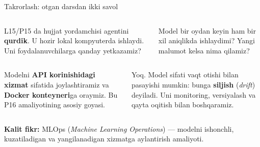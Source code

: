 \documentclass[aspectratio=169,11pt]{beamer}
\newcommand{\uzq}{\textquotesingle{}}   %
\begin{document}
\begin{frame}{Takrorlash: o\uzq{}tgan darsdan ikki savol}
  \small

  \begin{columns}[T,totalwidth=\textwidth]
    \begin{column}{0.49\textwidth}
      \begin{tcolorbox}[warnbox,title=1-savol]
        L15/P15 da hujjat yordamchisi agentini \textbf{qurdik}.
        U hozir lokal kompyuterda ishlaydi. Uni foydalanuvchilarga
        qanday yetkazamiz?
      \end{tcolorbox}
    \end{column}

    \begin{column}{0.49\textwidth}
      \begin{tcolorbox}[warnbox,title=2-savol]
        Model bir oydan keyin ham bir xil aniqlikda ishlaydimi?
        Yangi ma\uzq{}lumot kelsa nima qilamiz?
      \end{tcolorbox}
    \end{column}
  \end{columns}

  \pause
  \vspace{5pt}

  \begin{columns}[T,totalwidth=\textwidth]
    \begin{column}{0.49\textwidth}
      \begin{tcolorbox}[okbox,title=1-javob]
        Modelni \textbf{API ko\uzq{}rinishidagi xizmat} sifatida
        joylashtiramiz va \textbf{Docker konteyneri}ga o\uzq{}raymiz.
        Bu P16 amaliyotining asosiy g\uzq{}oyasi.
      \end{tcolorbox}
    \end{column}

    \begin{column}{0.49\textwidth}
      \begin{tcolorbox}[okbox,title=2-javob]
        Yo\uzq{}q. Model sifati vaqt o\uzq{}tishi bilan pasayishi mumkin:
        bunga \textbf{siljish} (\textit{drift}) deyiladi.
        Uni monitoring, versiyalash va qayta o\uzq{}qitish bilan boshqaramiz.
      \end{tcolorbox}
    \end{column}
  \end{columns}

  \vspace{3pt}
  {\scriptsize
  \textbf{Kalit fikr:} MLOps (\textit{Machine Learning Operations}) ---
  modelni ishonchli, kuzatiladigan va yangilanadigan xizmatga aylantirish amaliyoti.
  }
\end{frame}
\end{document}
